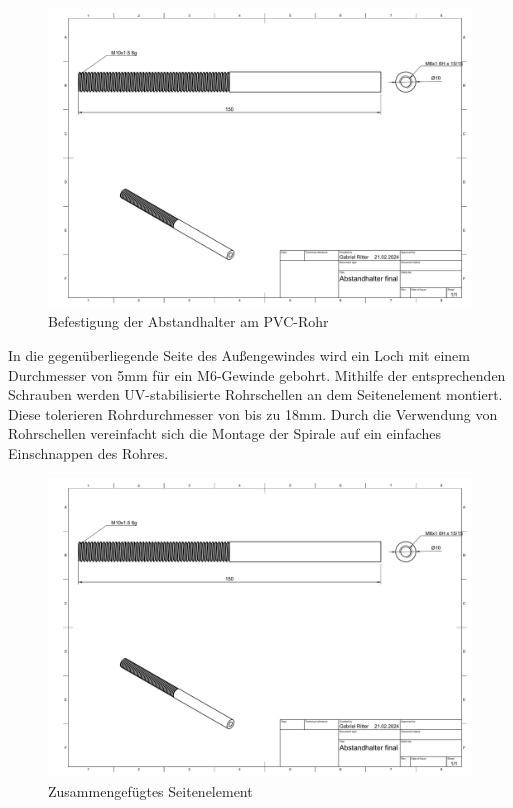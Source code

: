 \begin{figure}[h!]
	\centering
	\includegraphics[width=\textwidth]{../ref/Abstandhalter final Zeichnung v2.pdf}
	\caption{Befestigung der Abstandhalter am PVC-Rohr}
	\label{fig:Abstandhalter-Befestigung}
\end{figure}

In die gegenüberliegende Seite des Außengewindes wird ein Loch mit einem Durchmesser von 5mm für ein M6-Gewinde gebohrt. Mithilfe der entsprechenden Schrauben werden UV-stabilisierte Rohrschellen an dem Seitenelement montiert. Diese tolerieren Rohrdurchmesser von bis zu 18mm. Durch die Verwendung von Rohrschellen vereinfacht sich die Montage der Spirale auf ein einfaches Einschnappen des Rohres.

\begin{figure}[h!]
	\centering
	\includegraphics[width=\textwidth]{../ref/Abstandhalter final Zeichnung v2.pdf}
	\caption{Zusammengefügtes Seitenelement}
	\label{fig:Seitenelement-komplett}
\end{figure}

